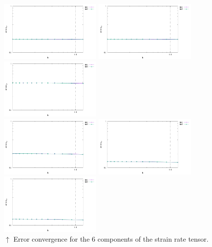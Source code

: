 \begin{center}
\includegraphics[width=5cm]{python_codes/fieldstone_75/results/mms3D/errors_exx}
\includegraphics[width=5cm]{python_codes/fieldstone_75/results/mms3D/errors_eyy}
\includegraphics[width=5cm]{python_codes/fieldstone_75/results/mms3D/errors_ezz}\\
\includegraphics[width=5cm]{python_codes/fieldstone_75/results/mms3D/errors_exy}
\includegraphics[width=5cm]{python_codes/fieldstone_75/results/mms3D/errors_exz}
\includegraphics[width=5cm]{python_codes/fieldstone_75/results/mms3D/errors_eyz}\\
{\captionfont $\uparrow$ Error convergence for the 6 components of the strain rate tensor.}
\end{center}

